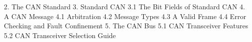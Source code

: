 2. The CAN Standard 
3. Standard CAN 
3.1 The Bit Fields of Standard CAN
4. A CAN Message 
4.1 Arbitration 
4.2 Message Types 
4.3 A Valid Frame 
4.4 Error Checking and Fault Confinement
5. The CAN Bus
5.1 CAN Transceiver Features
5.2 CAN Transceiver Selection Guide 